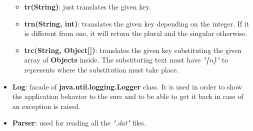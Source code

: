 \documentclass[11pt]{article}
\begin{document}
\begin{itemize}
\begin{itemize}
			\item \textbf{tr(String)}: just translates the given key.
			\item \textbf{trn(String, int)}: translates the given key depending on the integer. If it is different from one, it will return the plural and the singular otherwise.
			\item \textbf{trc(String, Object[])}: translates the given key substituting the given array of \textbf{Objects} inside. The substituting text must have \textit{"\{n\}"} to represents where the substitution must take place.
		\end{itemize}
		\item \textbf{Log}: facade of \textbf{java.util.logging.Logger} class. It is used in order to show the application behavior to the sure and to be able to get it back in case of an exception is raised.
		\item \textbf{Parser}: used for reading all the \textit{".dat"} files.
   \end{itemize}
\end{document}
